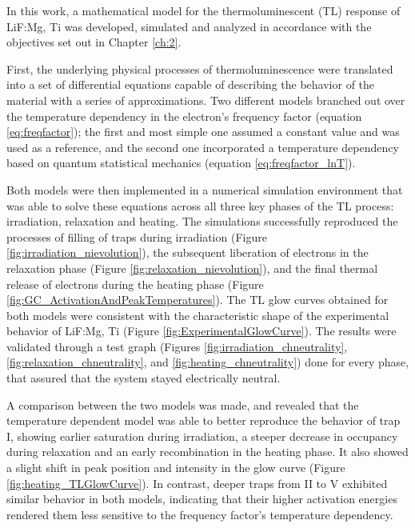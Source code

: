 In this work, a mathematical model for the thermoluminescent (TL) response of LiF:Mg, Ti was developed, simulated and analyzed in accordance with the objectives set out in Chapter \ref{ch:2}. 

\vspace{10pt}

First, the underlying physical processes of thermoluminescence were translated into a set of differential equations capable of describing the behavior of the material with a series of approximations. Two different models branched out over the temperature dependency in the electron's frequency factor (equation \ref{eq:freqfactor}); the first and most simple one assumed a constant value and was used as a reference, and the second one incorporated a temperature dependency based on quantum statistical mechanics (equation \ref{eq:freqfactor_lnT}). 

\vspace{10pt}

Both models were then implemented in a numerical simulation environment that was able to solve these equations across all three key phases of the TL process: irradiation, relaxation and heating. The simulations successfully reproduced the processes of filling of traps during irradiation (Figure \ref{fig:irradiation_nievolution}), the subsequent liberation of electrons in the relaxation phase (Figure \ref{fig:relaxation_nievolution}), and the final thermal release of electrons during the heating phase (Figure \ref{fig:GC_ActivationAndPeakTemperatures}). The TL glow curves obtained for both models were consistent with the characteristic shape of the experimental behavior of LiF:Mg, Ti (Figure \ref{fig:ExperimentalGlowCurve}). The results were validated through a test graph (Figures \ref{fig:irradiation_chneutrality}, \ref{fig:relaxation_chneutrality}, and \ref{fig:heating_chneutrality}) done for every phase, that assured that the system stayed electrically neutral.

\vspace{10pt}

A comparison between the two models was made, and revealed that the temperature dependent model was able to better reproduce the behavior of trap I, showing earlier saturation during irradiation, a steeper decrease in occupancy during relaxation and an early recombination in the heating phase. It also showed a slight shift in peak position and intensity in the glow curve (Figure \ref{fig:heating_TLGlowCurve}). In contrast, deeper traps from II to V exhibited similar behavior in both models, indicating that their higher activation energies rendered them less sensitive to the frequency factor's temperature dependency.

